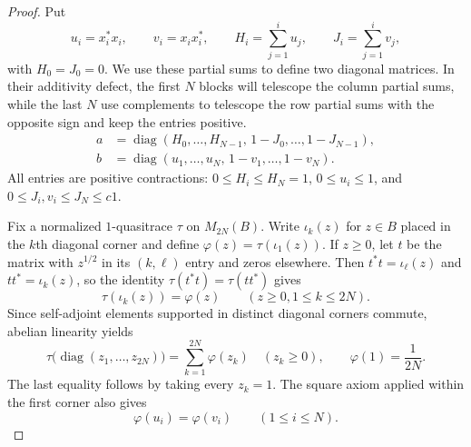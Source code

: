 \begin{proof}
Put
\[
  u_i=x_i^*x_i,\qquad v_i=x_ix_i^*,\qquad
  H_i=\sum_{j=1}^i u_j,\qquad J_i=\sum_{j=1}^i v_j,
\]
with $H_0=J_0=0$.  We use these partial sums to define two diagonal
matrices.  In their additivity defect, the first $N$ blocks will telescope
the column partial sums, while the last $N$ use complements to telescope
the row partial sums with the opposite sign and keep the entries positive.
\begin{equation}
\begin{aligned}
  a&=\operatorname{diag}
      (H_0,\ldots,H_{N-1},\,1-J_0,\ldots,1-J_{N-1}),\\
  b&=\operatorname{diag}
      (u_1,\ldots,u_N,\,1-v_1,\ldots,1-v_N).
\end{aligned}
\label{eq:defect-pair}
\end{equation}
All entries are positive contractions: $0\le H_i\le H_N=1$,
$0\le u_i\le1$, and $0\le J_i,v_i\le J_N\le c1$.

Fix a normalized $1$-quasitrace $\tau$ on $M_{2N}(B)$.  Write
$\iota_k(z)$ for $z\in B$ placed in the $k$th diagonal corner and
define $\varphi(z)=\tau(\iota_1(z))$.  If $z\ge0$, let $t$ be the
matrix with $z^{1/2}$ in its $(k,\ell)$ entry and zeros elsewhere.
Then $t^*t=\iota_\ell(z)$ and $tt^*=\iota_k(z)$, so the identity
$\tau(t^*t)=\tau(tt^*)$ gives
\[
  \tau(\iota_k(z))=\varphi(z)
  \qquad (z\ge0, 1\le k\le2N).
\]
Since self-adjoint elements supported in distinct diagonal corners
commute, abelian linearity yields
\begin{equation}
  \tau\bigl(\operatorname{diag}(z_1,\ldots,z_{2N})\bigr)
    =\sum_{k=1}^{2N}\varphi(z_k)
  \quad (z_k\ge0),
  \qquad \varphi(1)=\frac1{2N}.
  \label{eq:corner-normalization}
\end{equation}
The last equality follows by taking every $z_k=1$.  The square axiom
applied within the first corner also gives
\begin{equation}
  \varphi(u_i)=\varphi(v_i)\qquad (1\le i\le N).
  \label{eq:corner-square-equality}
\end{equation}


\end{proof}
